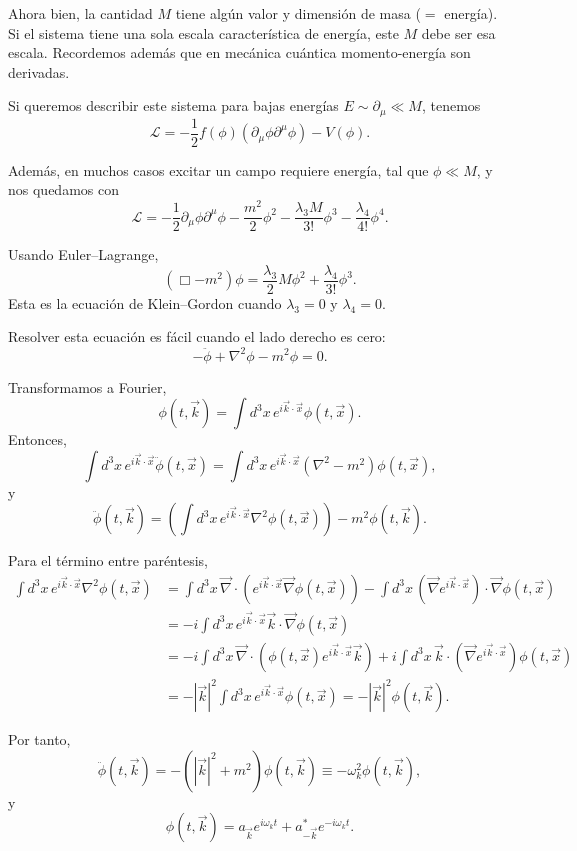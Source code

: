 \documentclass[11pt,a4paper]{article}
\newcommand{\concept}[1]{\textcolor{concept-green}{#1}}
\begin{document}
Ahora bien, la cantidad $M$ tiene algún valor y dimensión de masa ($=$ energía). Si el sistema tiene una sola escala característica de energía, este $M$ debe ser esa escala. Recordemos además que en mecánica cuántica momento-energía son derivadas.

Si queremos describir este sistema para bajas energías $E\sim\partial_\mu\ll M$, tenemos
\[
  \mathcal L=-\frac12 f(\phi)
    (\partial_\mu\phi\partial^\mu\phi)-V(\phi).
\]

Además, en muchos casos excitar un campo requiere energía, tal que $\phi\ll M$, y nos quedamos con
\[
  \mathcal L
  =-\frac12\partial_\mu\phi\partial^\mu\phi
   -\frac{m^2}{2}\phi^2
   -\frac{\lambda_3M}{3!}\phi^3
   -\frac{\lambda_4}{4!}\phi^4.
\]

Usando Euler--Lagrange,
\[
  (\Box-m^2)\phi
  =\frac{\lambda_3}{2}M\phi^2
   +\frac{\lambda_4}{3!}\phi^3.
\]
Esta es la \concept{ecuación de Klein--Gordon} cuando $\lambda_3=0$ y $\lambda_4=0$.

Resolver esta ecuación es fácil cuando el lado derecho es cero:
\[
  -\ddot\phi+\nabla^2\phi-m^2\phi=0.
\]

Transformamos a Fourier,
\[
  \phi(t,\vec k)=\int d^3x\,e^{i\vec k\cdot\vec x}\phi(t,\vec x).
\]
Entonces,
\[
  \int d^3x\,e^{i\vec k\cdot\vec x}\ddot\phi(t,\vec x)
  =\int d^3x\,e^{i\vec k\cdot\vec x}
    (\nabla^2-m^2)\phi(t,\vec x),
\]
y
\[
  \ddot\phi(t,\vec k)
  =\left(\int d^3x\,e^{i\vec k\cdot\vec x}
      \nabla^2\phi(t,\vec x)\right)-m^2\phi(t,\vec k).
\]

Para el término entre paréntesis,
\begin{align*}
  \int d^3x\,e^{i\vec k\cdot\vec x}\nabla^2\phi(t,\vec x)
  &=\int d^3x\,\vec\nabla\cdot
      \left(e^{i\vec k\cdot\vec x}\vec\nabla\phi(t,\vec x)\right)
    -\int d^3x\,
      \left(\vec\nabla e^{i\vec k\cdot\vec x}\right)
      \cdot\vec\nabla\phi(t,\vec x) \\
  &=-i\int d^3x\,e^{i\vec k\cdot\vec x}
      \vec k\cdot\vec\nabla\phi(t,\vec x) \\
  &=-i\int d^3x\,\vec\nabla\cdot
      \left(\phi(t,\vec x)e^{i\vec k\cdot\vec x}\vec k\right)
    +i\int d^3x\,
      \vec k\cdot\left(\vec\nabla e^{i\vec k\cdot\vec x}\right)
      \phi(t,\vec x) \\
  &=-|\vec k|^2\int d^3x\,
      e^{i\vec k\cdot\vec x}\phi(t,\vec x)
   =-|\vec k|^2\phi(t,\vec k).
\end{align*}

Por tanto,
\[
  \ddot\phi(t,\vec k)
  =-(|\vec k|^2+m^2)\phi(t,\vec k)
  \equiv-\omega_k^2\phi(t,\vec k),
\]
y
\[
  \phi(t,\vec k)
  =a_{\vec k}e^{i\omega_k t}+a_{-\vec k}^*e^{-i\omega_k t}.
\]
\end{document}

